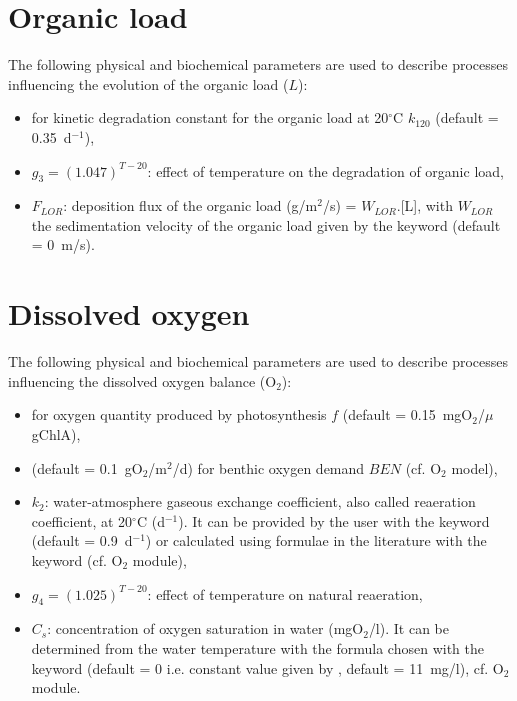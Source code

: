 \section{Organic load}

The following physical and biochemical parameters are used to describe processes
influencing the evolution of the organic load ($L$):

\begin{itemize}
\item {}
  for kinetic degradation constant for the organic load at 20$^{\circ}$C $k_{120}$
  (default = 0.35~d$^{-1}$),
\item $g_3 = (1.047)^{T-20}$: effect of temperature on the degradation of organic load,
\item $F_{LOR}$: deposition flux of the organic load (g/m$^2$/s) = $W_{LOR}$.[L],
  with $W_{LOR}$ the sedimentation velocity of the organic load
  given by the keyword 
  (default = 0~m/s).
\end{itemize}

\section{Dissolved oxygen}

The following physical and biochemical parameters are used to describe processes
influencing the dissolved oxygen balance (O$_2$):

\begin{itemize}
\item {}
  for oxygen quantity produced by photosynthesis $f$
  (default = 0.15~mgO$_2$/$\mu$gChlA),
\item  {} (default = 0.1~gO$_2$/m$^2$/d)
  for benthic oxygen demand $BEN$ (cf. O$_2$ model),
\item $k_2$: water-atmosphere gaseous exchange coefficient,
  also called reaeration coefficient, at 20$^{\circ}$C (d$^{-1}$).
  It can be provided by the user with the keyword
   (default = 0.9~d$^{-1}$)
  or calculated using formulae in the literature
  with the keyword  (cf. O$_2$ module),
\item $g_4 = (1.025)^{T-20}$: effect of temperature on natural reaeration,
\item $C_s$: concentration of oxygen saturation in water (mgO$_2$/l).
  It can be determined from the water temperature
  with the formula chosen with the keyword
   (default = 0 i.e. constant value given by
  , default = 11~mg/l),
  cf. O$_2$ module.
\end{itemize}


